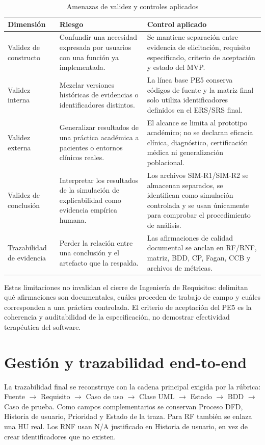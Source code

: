\documentclass[12pt,a4paper]{article}
\begin{document}
\begin{table}[H]\centering\caption{Amenazas de validez y controles aplicados}
\small
\begin{tabularx}{\textwidth}{p{}p{}X}
\toprule
\textbf{Dimensión}&\textbf{Riesgo}&\textbf{Control aplicado}\\\midrule
Validez de constructo&Confundir una necesidad expresada por usuarios con una función ya implementada.&Se mantiene separación entre evidencia de elicitación, requisito especificado, criterio de aceptación y estado del MVP.\\
Validez interna&Mezclar versiones históricas de evidencias o identificadores distintos.&La línea base PE5 conserva códigos de fuente y la matriz final solo utiliza identificadores definidos en el ERS/SRS final.\\
Validez externa&Generalizar resultados de una práctica académica a pacientes o entornos clínicos reales.&El alcance se limita al prototipo académico; no se declaran eficacia clínica, diagnóstico, certificación médica ni generalización poblacional.\\
Validez de conclusión&Interpretar los resultados de la simulación de explicabilidad como evidencia empírica humana.&Los archivos SIM-R1/SIM-R2 se almacenan separados, se identifican como simulación controlada y se usan únicamente para comprobar el procedimiento de análisis.\\
Trazabilidad de evidencia&Perder la relación entre una conclusión y el artefacto que la respalda.&Las afirmaciones de calidad documental se anclan en RF/RNF, matriz, BDD, CP, Fagan, CCB y archivos de métricas.\\
\bottomrule
\end{tabularx}
\normalsize
\end{table}

Estas limitaciones no invalidan el cierre de Ingeniería de Requisitos: delimitan qué afirmaciones son documentales, cuáles proceden de trabajo de campo y cuáles corresponden a una práctica controlada. El criterio de aceptación del PE5 es la coherencia y auditabilidad de la especificación, no demostrar efectividad terapéutica del software.

\section{Gestión y trazabilidad end-to-end}
La trazabilidad final se reconstruye con la cadena principal exigida por la rúbrica: Fuente $\rightarrow$ Requisito $\rightarrow$ Caso de uso $\rightarrow$ Clase UML $\rightarrow$ Estado $\rightarrow$ BDD $\rightarrow$ Caso de prueba. Como campos complementarios se conservan Proceso DFD, Historia de usuario, Prioridad y Estado de la traza. Para RF también se enlaza una HU real. Los RNF usan N/A justificado en Historia de usuario, en vez de crear identificadores que no existen.
\end{document}
